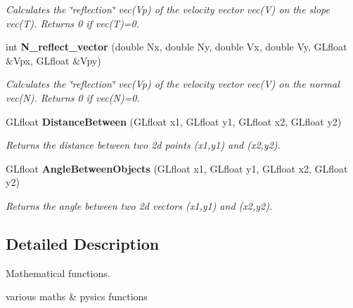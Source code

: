 \begin{CompactItemize}
\begin{CompactList}\small\item\em Calculates the \char`\"{}reflection\char`\"{} vec(Vp) of the velocity vector vec(V) on the slope vec(T). Returns 0 if vec(T)=0. \item\end{CompactList}\item 
int {\bf N\_\-reflect\_\-vector} (double Nx, double Ny, double Vx, double Vy, GLfloat \&Vpx, GLfloat \&Vpy)\label{iteam__maths_8cpp_46394c0acfe63de175107fb648ec74e8}

\begin{CompactList}\small\item\em Calculates the \char`\"{}reflection\char`\"{} vec(Vp) of the velocity vector vec(V) on the normal vec(N). Returns 0 if vec(N)=0. \item\end{CompactList}\item 
GLfloat {\bf DistanceBetween} (GLfloat x1, GLfloat y1, GLfloat x2, GLfloat y2)\label{iteam__maths_8cpp_7212744857924b223ed1f60b162b20e0}

\begin{CompactList}\small\item\em Returns the distance between two 2d points (x1,y1) and (x2,y2). \item\end{CompactList}\item 
GLfloat {\bf AngleBetweenObjects} (GLfloat x1, GLfloat y1, GLfloat x2, GLfloat y2)\label{iteam__maths_8cpp_c4f8d649072c19292317794a3f874ba2}

\begin{CompactList}\small\item\em Returns the angle between two 2d vectors (x1,y1) and (x2,y2). \item\end{CompactList}\end{CompactItemize}


\subsection{Detailed Description}
Mathematical functions. 

various maths \& pysics functions 